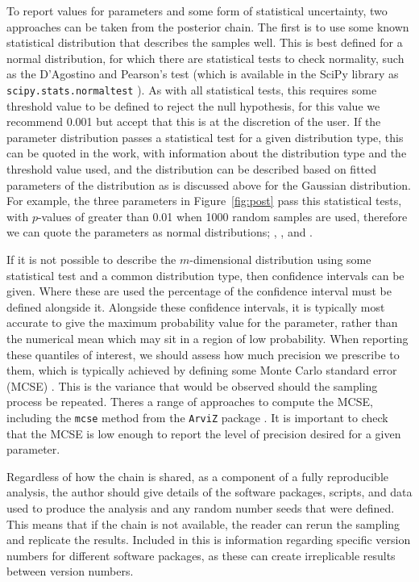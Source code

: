 \documentclass[reprint,superscriptaddress,aps,amsmath,linenumbers]{revtex4-2}
\begin{document}
To report values for parameters and some form of statistical uncertainty, two approaches can be taken from the posterior chain. 
The first is to use some known statistical distribution that describes the samples well.
This is best defined for a normal distribution, for which there are statistical tests to check normality, such as the D'Agostino and Pearson's test \cite{dagostino_omnibus_1971,dagostino_tests_1973} (which is available in the SciPy library as \texttt{scipy.stats.normaltest} \cite{virtanen_scipy_2020}).
As with all statistical tests, this requires some threshold value to be defined to reject the null hypothesis, for this value we recommend \num{0.001} but accept that this is at the discretion of the user. 
If the parameter distribution passes a statistical test for a given distribution type, this can be quoted in the work, with information about the distribution type and the threshold value used, and the distribution can be described based on fitted parameters of the distribution as is discussed above for the Gaussian distribution. 
For example, the three parameters in Figure~\ref{fig:post} pass this statistical tests, with $p$-values of greater than \num{0.01} when \num{1000} random samples are used, therefore we can quote the parameters as normal distributions; \unskip, \unskip, and \unskip.

If it is not possible to describe the $m$-dimensional distribution using some statistical test and a common distribution type, then confidence intervals can be given. 
Where these are used the percentage of the confidence interval must be defined alongside it. 
Alongside these confidence intervals, it is typically most accurate to give the maximum probability value for the parameter, rather than the numerical mean which may sit in a region of low probability.
When reporting these quantiles of interest, we should assess how much precision we prescribe to them, which is typically achieved by defining some Monte Carlo standard error (MCSE) \cite{vehtari_rank_2021}. 
This is the variance that would be observed should the sampling process be repeated. 
Theres a range of approaches to compute the MCSE, including the \texttt{mcse} method from the \texttt{ArviZ} package \cite{kumar_arviz_2019}.
It is important to check that the MCSE is low enough to report the level of precision desired for a given parameter. 

Regardless of how the chain is shared, as a component of a fully reproducible analysis, the author should give details of the software packages, scripts, and data used to produce the analysis and any random number seeds that were defined. 
This means that if the chain is not available, the reader can rerun the sampling and replicate the results. 
Included in this is information regarding specific version numbers for different software packages, as these can create irreplicable results between version numbers. 
\end{document}
